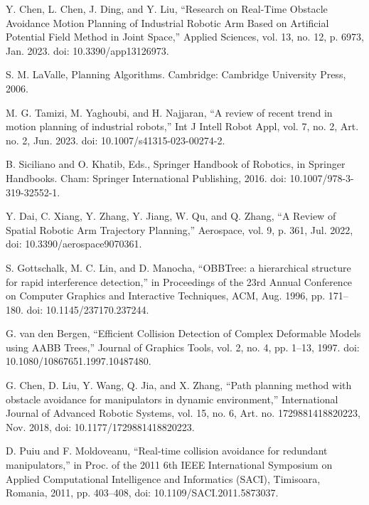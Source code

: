 \documentclass[letterpaper, 10 pt, conference]{ieeeconf}  %
\begin{document}
\begin{thebibliography}{99}
 Y. Chen, L. Chen, J. Ding, and Y. Liu, “Research on Real-Time Obstacle Avoidance Motion Planning of Industrial Robotic Arm Based on Artificial Potential Field Method in Joint Space,” Applied Sciences, vol. 13, no. 12, p. 6973, Jan. 2023. doi: 10.3390/app13126973.

 S. M. LaValle, Planning Algorithms. Cambridge: Cambridge University Press, 2006.

 M. G. Tamizi, M. Yaghoubi, and H. Najjaran, “A review of recent trend in motion planning of industrial robots,” Int J Intell Robot Appl, vol. 7, no. 2, Art. no. 2, Jun. 2023. doi: 10.1007/s41315-023-00274-2.







 B. Siciliano and O. Khatib, Eds., Springer Handbook of Robotics, in Springer Handbooks. Cham: Springer International Publishing, 2016. doi: 10.1007/978-3-319-32552-1.



 Y. Dai, C. Xiang, Y. Zhang, Y. Jiang, W. Qu, and Q. Zhang, “A Review of Spatial Robotic Arm Trajectory Planning,” Aerospace, vol. 9, p. 361, Jul. 2022, doi: 10.3390/aerospace9070361.

 S. Gottschalk, M. C. Lin, and D. Manocha, “OBBTree: a hierarchical structure for rapid interference detection,” in Proceedings of the 23rd Annual Conference on Computer Graphics and Interactive Techniques, ACM, Aug. 1996, pp. 171–180. doi: 10.1145/237170.237244.

 G. van den Bergen, “Efficient Collision Detection of Complex Deformable Models using AABB Trees,” Journal of Graphics Tools, vol. 2, no. 4, pp. 1–13, 1997. doi: 10.1080/10867651.1997.10487480.

 G. Chen, D. Liu, Y. Wang, Q. Jia, and X. Zhang, “Path planning method with obstacle avoidance for manipulators in dynamic environment,” International Journal of Advanced Robotic Systems, vol. 15, no. 6, Art. no. 1729881418820223, Nov. 2018, doi: 10.1177/1729881418820223.

 D. Puiu and F. Moldoveanu, “Real-time collision avoidance for redundant manipulators,” in Proc. of the 2011 6th IEEE International Symposium on Applied Computational Intelligence and Informatics (SACI), Timisoara, Romania, 2011, pp. 403–408, doi: 10.1109/SACI.2011.5873037.




\end{thebibliography}
\end{document}
